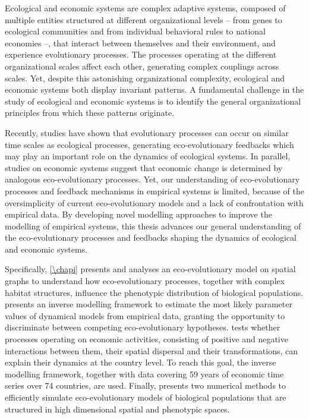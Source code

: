 %
\label{sec:summary}
\small{
    Ecological and economic systems are complex adaptive systems, composed of multiple entities structured at different organizational levels -- from genes to ecological communities and from individual behavioral rules to national economies --, that interact between themselves and their environment, and experience evolutionary processes. The processes operating at the different organizational scales affect each other, generating complex couplings across scales. Yet, despite this astonishing organizational complexity, ecological and economic systems both display invariant patterns. A fundamental challenge in the study of ecological and economic systems is to identify the general organizational principles from which these patterns originate.

    Recently, studies have shown that evolutionary processes can occur on similar time scales as ecological processes, generating eco-evolutionary feedbacks which may play an important role on the dynamics of ecological systems. In parallel, studies on economic systems suggest that economic change is determined by analogous eco-evolutionary processes. Yet, our understanding of eco-evolutionary processes and feedback mechanisms in empirical systems is limited, because of the oversimplicity of current eco-evolutionary models and a lack of confrontation with empirical data. By developing novel modelling approaches to improve the modelling of empirical systems, this thesis advances our general understanding of the eco-evolutionary processes and feedbacks shaping the dynamics of ecological and economic systems.
    
    Specifically, \cref{\chapi} presents and analyses an eco-evolutionary model on spatial graphs to understand how eco-evolutionary processes, together with complex habitat structures, influence the phenotypic distribution of biological populations. \Cref{\chapii} presents an inverse modelling framework to estimate the most likely parameter values of dynamical models from empirical data, granting the opportunity to discriminate between competing eco-evolutionary hypotheses. \Cref{\chapiv} tests whether processes operating on economic activities, consisting of positive and negative interactions between them, their spatial dispersal and their transformations, can explain their dynamics at the country level. To reach this goal, the inverse modelling framework, together with data covering 59 years of economic time series over 74 countries, are used. Finally, \Cref{\chapiv} presents two numerical methods to efficiently simulate eco-evolutionary models of biological populations that are structured in high dimensional spatial and phenotypic spaces.
    
}
